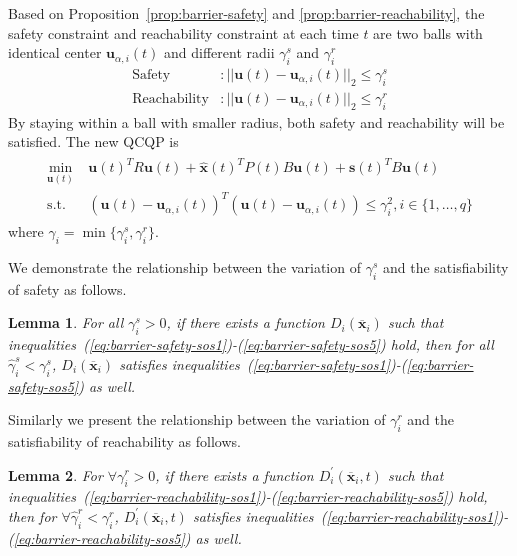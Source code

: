 \documentclass[journal]{IEEEtran}
\newtheorem{Lemma}{Lemma}
\begin{document}
Based on Proposition~\ref{prop:barrier-safety} and \ref{prop:barrier-reachability}, the safety constraint and reachability constraint at each time $t$ are two balls with identical center $\mathbf{u}_{\alpha,i}(t)$ and different radii $\gamma_i^s$ and $\gamma_i^r$
\begin{equation*}
    \begin{array}{cc}
        \text{Safety}&:||\mathbf{u}(t) - \mathbf{u}_{\alpha,i}(t)||_{2} \leq \gamma_i^s \\
        \text{Reachability}&:||\mathbf{u}(t) - \mathbf{u}_{\alpha,i}(t)||_{2} \leq \gamma_i^r 
    \end{array}
\end{equation*}
By staying within a ball with smaller radius, both safety and reachability will be satisfied. The new QCQP is
 \begin{align}
  \label{eq:QCQP-final}
  \begin{split}
      \min_{\mathbf{u}(t)} \ & \mathbf{u}(t)^{T}R\mathbf{u}(t) + \hat{\mathbf{x}}(t)^{T}P(t)B\mathbf{u}(t) + \mathbf{s}(t)^{T}B\mathbf{u}(t) \\
 \mbox{s.t.} \ & \left(\mathbf{u}(t) - \mathbf{u}_{\alpha,i}(t)\right)^T\left(\mathbf{u}(t) - \mathbf{u}_{\alpha,i}(t)\right) \leq \gamma_i^2, i \in \{1,\ldots,q\}
  \end{split}
 \end{align}
where $\gamma_i = \min \{\gamma_i^s, \gamma_i^r\}$. %

We demonstrate the relationship between the variation of $\gamma_i^s$ and the satisfiability of safety as follows.
\begin{Lemma}
\label{lemma:monotonicity-gamma-safety}
    For all $\gamma_i^s > 0$, if there exists a function $D_i(\overline{\mathbf{x}}_i)$ such that inequalities~(\ref{eq:barrier-safety-sos1})-(\ref{eq:barrier-safety-sos5}) hold, then for all $\hat{\gamma}_i^{s} < \gamma_i^s$, $D_i(\overline{\mathbf{x}}_i)$ satisfies inequalities~(\ref{eq:barrier-safety-sos1})-(\ref{eq:barrier-safety-sos5}) as well.
\end{Lemma}
 
Similarly we present the relationship between the variation of $\gamma_i^r$ and the satisfiability of reachability as follows.
 
\begin{Lemma}
\label{lemma:monotonicity-gamma-reachability}
    For $\forall \gamma_i^r > 0$, if there exists a function $D_i^{\prime}(\overline{\mathbf{x}}_i, t)$ such that  inequalities~(\ref{eq:barrier-reachability-sos1})-(\ref{eq:barrier-reachability-sos5}) hold, then for $\forall \hat{\gamma}_i^{r} < \gamma_i^r$, $D_i^{\prime}(\overline{\mathbf{x}}_i, t)$ satisfies inequalities~(\ref{eq:barrier-reachability-sos1})-(\ref{eq:barrier-reachability-sos5}) as well.
\end{Lemma}
 
\end{document}
